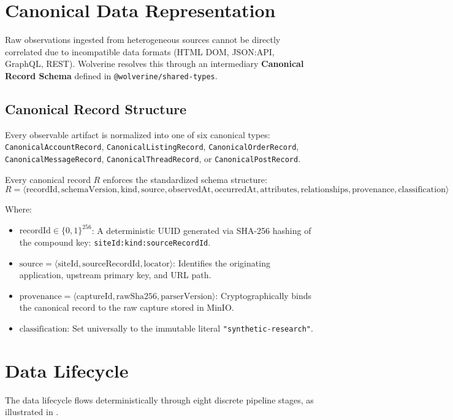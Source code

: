 \section{Canonical Data Representation}
\label{sec:data-canonical}
Raw observations ingested from heterogeneous sources cannot be directly correlated due to incompatible data formats (HTML DOM, JSON:API, GraphQL, REST). Wolverine resolves this through an intermediary \textbf{Canonical Record Schema} defined in \texttt{@wolverine/shared-types}.

\subsection{Canonical Record Structure}
Every observable artifact is normalized into one of six canonical types: \texttt{CanonicalAccountRecord}, \texttt{CanonicalListingRecord}, \texttt{CanonicalOrderRecord}, \texttt{CanonicalMessageRecord}, \texttt{CanonicalThreadRecord}, or \texttt{CanonicalPostRecord}.

Every canonical record $R$ enforces the standardized schema structure:
\begin{equation}
\label{eq:canonical-record}
R = \langle \text{recordId}, \text{schemaVersion}, \text{kind}, \text{source}, \text{observedAt}, \text{occurredAt}, \text{attributes}, \text{relationships}, \text{provenance}, \text{classification} \rangle
\end{equation}

Where:
\begin{itemize}
    \item $\text{recordId} \in \{0,1\}^{256}$: A deterministic UUID generated via SHA-256 hashing of the compound key: \texttt{siteId:kind:sourceRecordId}.
    \item $\text{source} = \langle \text{siteId}, \text{sourceRecordId}, \text{locator} \rangle$: Identifies the originating application, upstream primary key, and URL path.
    \item $\text{provenance} = \langle \text{captureId}, \text{rawSha256}, \text{parserVersion} \rangle$: Cryptographically binds the canonical record to the raw capture stored in MinIO.
    \item $\text{classification}$: Set universally to the immutable literal \texttt{"synthetic-research"}.
\end{itemize}

\section{Data Lifecycle}
\label{sec:data-lifecycle}
The data lifecycle flows deterministically through eight discrete pipeline stages, as illustrated in .

